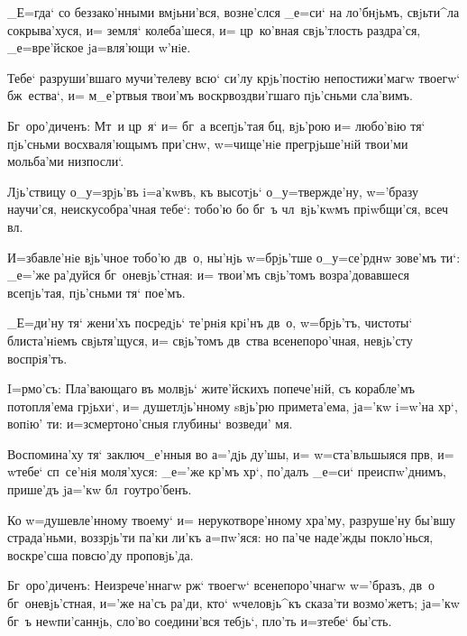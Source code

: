 
_Е=гда` со беззако'нными вмjьни'вся, возне'слся _е=си` 
на ло'бнjьмъ, свjьти^ла сокрыва'хуся, и= земля` 
колеба'шеся, и= цр~ко'вная свjь'тлость раздра'ся, 
_е=вре'йское jа=вля'ющи w'нiе.

Тебе` разруши'вшаго мучи'телеву всю` си'лу крjь'постiю 
непостижи'магw твоегw` бж~ества`, и= м_е'ртвыя твои'мъ 
воскр воздви'гшаго пjь'сньми сла'вимъ.

Бг~оро'диченъ: Мт~и цр~я` и= бг~а всепjь'тая бц, 
вjь'рою и= любо'вiю тя` пjь'сньми восхваля'ющымъ при'снw, 
w=чище'нiе прегрjьше'нiй твои'ми мольба'ми низпосли`.


Лjь'ствицу о_у=зрjь'въ i=а'кwвъ, къ высотjь` 
о_у=твержде'ну, w='бразу научи'ся, неискусобра'чная 
тебе`: тобо'ю бо бг~ъ чл~вjь'кwмъ прiwбщи'ся, всеч 
вл.

И=збавле'нiе вjь'чное тобо'ю дв~о, ны'нjь w=брjь'тше 
о_у=се'рднw зове'мъ ти`: _е='же ра'дуйся бг~оневjь'стная: 
и= твои'мъ свjь'томъ возра'довавшеся всепjь'тая, 
пjь'сньми тя` пое'мъ.

_Е=ди'ну тя` жени'хъ посредjь` те'рнiя крi'нъ дв~о, 
w=брjь'тъ, чистоты` блиста'нiемъ свjьтя'щуся, и= 
свjь'томъ дв~ства всенепоро'чная, невjь'сту воспрiя'тъ.


I=рмо'съ: Пла'вающаго въ молвjь` жите'йскихъ 
попече'нiй, съ корабле'мъ потопля'ема грjьхи`, и= 
душетлjь'нному sвjь'рю примета'ема, jа='кw i=w'на 
хр`, вопiю' ти: и=з\ъ смертоно'сныя глубины` возведи' 
мя.

Воспомина'ху тя` заключ_е'нныя во а='дjь ду'шы, и= 
w=ста'вльшыяся прв, и= w\т тебе` сп~се'нiя 
моля'хуся: _е='же кр'мъ хр`, по'далъ _е=си` 
преиспw'днимъ, прише'дъ jа='кw бл~гоутро'бенъ.

Ко w=душевле'нному твоему` и= нерукотворе'нному 
хра'му, разруше'ну бы'вшу страда'ньми, воззрjь'ти па'ки 
ли'къ а=п w'яся: но па'че наде'жды 
покло'нься, воскре'сша повсю'ду проповjь'да.

Бг~оро'диченъ: Неизрече'ннагw рж` твоегw` 
всенепоро'чнагw w='бразъ, дв~о бг~оневjь'стная, и='же 
на'съ ра'ди, кто` w\т человjь^къ сказа'ти возмо'жетъ; 
jа='кw бг~ъ неwпи'саннjь, сло'во соедини'вся тебjь`, 
пло'ть и=з\ъ тебе` бы'сть.


